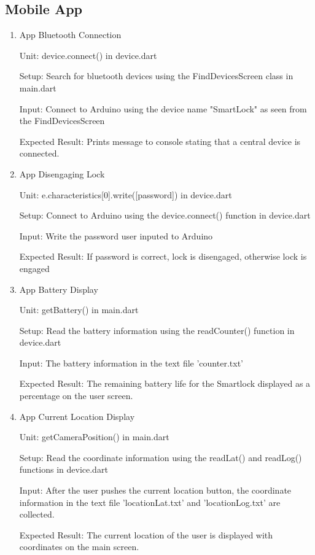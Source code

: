 \documentclass[12pt, titlepage]{article}
\begin{document}
\subsection{Mobile App}
\begin{enumerate}
     \item{App Bluetooth Connection} \label{appBluetoothConnection} 

    Unit: device.connect() in device.dart
    
    Setup: Search for bluetooth devices using the FindDevicesScreen class in main.dart

    Input: Connect to Arduino using the device name "SmartLock" as seen from the FindDevicesScreen 

    Expected Result: Prints message to console stating that a central device is connected.

    \item{App Disengaging Lock} \label{appDisengagingLock}

    Unit: e.characteristics[0].write([password]) in device.dart
    
    Setup: Connect to Arduino using the device.connect() function in device.dart

    Input: Write the password user inputed to Arduino 

    Expected Result: If password is correct, lock is disengaged, otherwise lock is engaged

    \item{App Battery Display} \label{batteryDisplay}

    Unit: getBattery() in main.dart
    
    Setup: Read the battery information using the readCounter() function in device.dart

    Input: The battery information in the text file 'counter.txt'

    Expected Result: The remaining battery life for the Smartlock displayed as a percentage on the user screen. 

    \item{App Current Location Display} \label{batteryDisplay}

    Unit: getCameraPosition() in main.dart
    
    Setup: Read the coordinate information using the readLat() and readLog() functions in device.dart

    Input: After the user pushes the current location button, the coordinate information in the text file 'locationLat.txt' and 'locationLog.txt' are collected. 

    Expected Result: The current location of the user is displayed with coordinates on the main screen. 
\end{enumerate}
\end{document}
